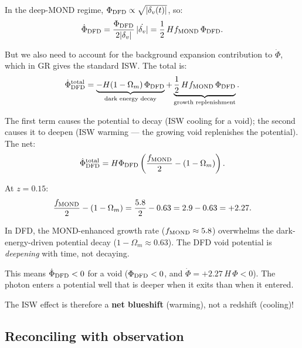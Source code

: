 \documentclass[11pt,a4paper]{article}
\newcommand{\Omm}{\Omega_m}
\newcounter{findingctr}
\newenvironment{finding}[1][]{%
  \refstepcounter{findingctr}%
  \begin{tcolorbox}[colback=blue!3!white, colframe=blue!50!black,
    title=\textbf{Finding \thefindingctr: #1}]
}{%
  \end{tcolorbox}%
}
\begin{document}
In the deep-MOND regime, $\Phi_{\rm DFD} \propto \sqrt{|\delta_v(t)|}$,
so:
\begin{equation}
\dot{\Phi}_{\rm DFD} = \frac{\Phi_{\rm DFD}}{2|\delta_v|}\,\dot{|\delta_v|}
= \frac{1}{2}\,Hf_{\rm MOND}\,\Phi_{\rm DFD}.
\label{eq:Phi-dot-DFD-deep}
\end{equation}

But we also need to account for the background expansion contribution
to $\dot{\Phi}$, which in GR gives the standard ISW. The total is:
\begin{equation}
\dot{\Phi}_{\rm DFD}^{\rm total}
= \underbrace{-H(1-\Omm)\,\Phi_{\rm DFD}}_{\text{dark energy decay}}
+ \underbrace{\frac{1}{2}\,Hf_{\rm MOND}\,\Phi_{\rm DFD}}_{\text{growth replenishment}}.
\label{eq:Phi-dot-total}
\end{equation}

The first term causes the potential to decay (ISW cooling for a void);
the second causes it to deepen (ISW warming --- the growing void
replenishes the potential). The net:
\begin{equation}
\dot{\Phi}_{\rm DFD}^{\rm total}
= H\Phi_{\rm DFD}\left(\frac{f_{\rm MOND}}{2} - (1 - \Omm)\right).
\label{eq:Phi-dot-net}
\end{equation}

At $z = 0.15$:
\begin{equation}
\frac{f_{\rm MOND}}{2} - (1 - \Omm)
= \frac{5.8}{2} - 0.63
= 2.9 - 0.63 = +2.27.
\label{eq:net-factor}
\end{equation}

\begin{finding}[The DFD Void Potential Deepens, Not Decays]
\label{find:deepening}
In DFD, the MOND-enhanced growth rate ($f_{\rm MOND} \approx 5.8$)
overwhelms the dark-energy-driven potential decay ($1 - \Omm \approx
0.63$). The DFD void potential is \emph{deepening} with time, not
decaying.

This means $\dot{\Phi}_{\rm DFD} < 0$ for a void ($\Phi_{\rm DFD} < 0$,
and $\dot{\Phi} = +2.27\,H\,\Phi < 0$). The photon enters a
potential well that is deeper when it exits than when it entered.

The ISW effect is therefore a \textbf{net blueshift} (warming), not
a redshift (cooling)!
\end{finding}

\subsection{Reconciling with observation}
\label{sec:reconcile}
\end{document}
